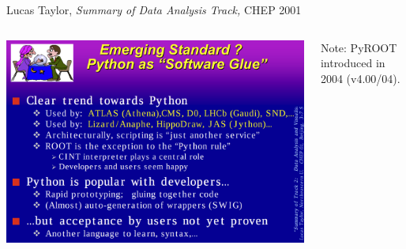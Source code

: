 \documentclass[aspectratio=169]{beamer}
\begin{document}
\begin{frame}{Lucas Taylor, {\it Summary of Data Analysis Track,} CHEP 2001}
\vspace{0.25 cm}
\begin{columns}

\includegraphics[width=\linewidth]{PLOTS/chep-2001-python.png}

Note: PyROOT introduced in 2004 (v4.00/04).
\end{columns}
\end{frame}
\end{document}
